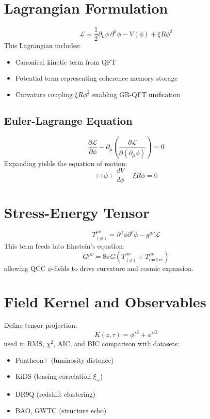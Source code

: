 \documentclass[11pt]{article}
\begin{document}
\section{Lagrangian Formulation}
\begin{equation}
\mathcal{L} = \frac{1}{2} \partial_\mu \phi \, \partial^\mu \phi - V(\phi) + \xi R \phi^2
\end{equation}
This Lagrangian includes:
\begin{itemize}
  \item Canonical kinetic term from QFT
  \item Potential term representing coherence memory storage
  \item Curvature coupling \( \xi R \phi^2 \) enabling GR-QFT unification
\end{itemize}

\subsection{Euler-Lagrange Equation}
\begin{equation}
\frac{\partial \mathcal{L}}{\partial \phi} - \partial_\mu \left(\frac{\partial \mathcal{L}}{\partial(\partial_\mu \phi)} \right) = 0
\end{equation}
Expanding yields the equation of motion:
\begin{equation}
\Box \phi + \frac{dV}{d\phi} - \xi R \phi = 0
\end{equation}

\section{Stress-Energy Tensor}
\begin{equation}
T^{\mu\nu}_{(\phi)} = \partial^\mu \phi \partial^\nu \phi - g^{\mu\nu} \mathcal{L}
\end{equation}
This term feeds into Einstein’s equation:
\begin{equation}
G^{\mu\nu} = 8\pi G \left( T^{\mu\nu}_{(\phi)} + T^{\mu\nu}_{\text{matter}} \right)
\end{equation}
allowing QCC \( \phi \)-fields to drive curvature and cosmic expansion.

\section{Field Kernel and Observables}
Define tensor projection:
\begin{equation}
K(z, \tau) = \phi'^2 + \phi''^2
\end{equation}
used in RMS, \( \chi^2 \), AIC, and BIC comparison with datasets:
\begin{itemize}
    \item Pantheon+ (luminosity distance)
    \item KiDS (lensing correlation \( \xi_+ \))
    \item DR9Q (redshift clustering)
    \item BAO, GWTC (structure echo)
\end{itemize}
\end{document}
